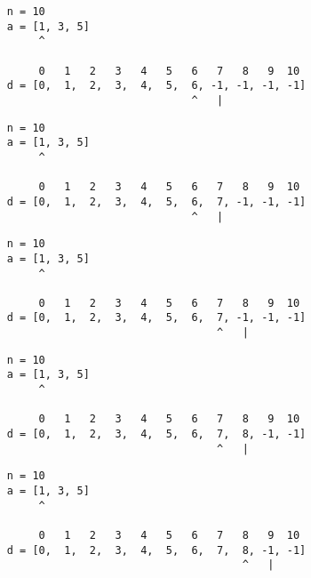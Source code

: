 \begin{frame}[fragile]
\begin{verbatim}
     n = 10
     a = [1, 3, 5]
          ^

          0   1   2   3   4   5   6   7   8   9  10
     d = [0,  1,  2,  3,  4,  5,  6, -1, -1, -1, -1]
                                  ^   |
\end{verbatim}
\end{frame}
\addtocounter{framenumber}{-1}

\begin{frame}[fragile]
\begin{verbatim}
     n = 10
     a = [1, 3, 5]
          ^

          0   1   2   3   4   5   6   7   8   9  10
     d = [0,  1,  2,  3,  4,  5,  6,  7, -1, -1, -1]
                                  ^   |
\end{verbatim}
\end{frame}
\addtocounter{framenumber}{-1}

\begin{frame}[fragile]
\begin{verbatim}
     n = 10
     a = [1, 3, 5]
          ^

          0   1   2   3   4   5   6   7   8   9  10
     d = [0,  1,  2,  3,  4,  5,  6,  7, -1, -1, -1]
                                      ^   |
\end{verbatim}
\end{frame}
\addtocounter{framenumber}{-1}

\begin{frame}[fragile]
\begin{verbatim}
     n = 10
     a = [1, 3, 5]
          ^

          0   1   2   3   4   5   6   7   8   9  10
     d = [0,  1,  2,  3,  4,  5,  6,  7,  8, -1, -1]
                                      ^   |
\end{verbatim}
\end{frame}
\addtocounter{framenumber}{-1}

\begin{frame}[fragile]
\begin{verbatim}
     n = 10
     a = [1, 3, 5]
          ^

          0   1   2   3   4   5   6   7   8   9  10
     d = [0,  1,  2,  3,  4,  5,  6,  7,  8, -1, -1]
                                          ^   |
\end{verbatim}
\end{frame}
\addtocounter{framenumber}{-1}

